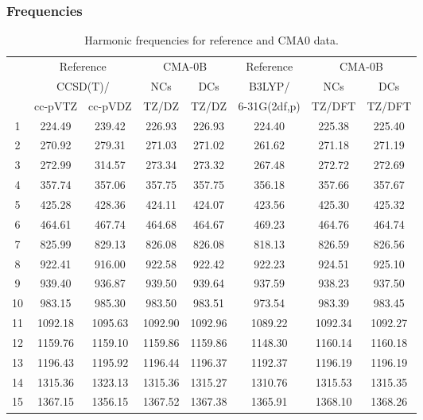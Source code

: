 \documentclass[10pt,oneside]{article}
\begin{document}
\clearpage

\subsubsection*{Frequencies}
\begin{table}[h!]
\centering
\caption{Harmonic frequencies for reference and CMA0 data.}
\begin{tabular}{cccccccc}
\toprule
{} & \multicolumn{2}{c}{Reference} & \multicolumn{2}{c}{CMA-0B} &    Reference & \multicolumn{2}{c}{CMA-0B} \\
{} & \multicolumn{2}{c}{CCSD(T)/} &     NCs &     DCs &       B3LYP/ &     NCs &     DCs \\
{} &   cc-pVTZ & cc-pVDZ &   TZ/DZ &   TZ/DZ & 6-31G(2df,p) &  TZ/DFT &  TZ/DFT \\
\midrule
1  &    224.49 &  239.42 &  226.93 &  226.93 &       224.40 &  225.38 &  225.40 \\
2  &    270.92 &  279.31 &  271.03 &  271.02 &       261.62 &  271.18 &  271.19 \\
3  &    272.99 &  314.57 &  273.34 &  273.32 &       267.48 &  272.72 &  272.69 \\
4  &    357.74 &  357.06 &  357.75 &  357.75 &       356.18 &  357.66 &  357.67 \\
5  &    425.28 &  428.36 &  424.11 &  424.07 &       423.56 &  425.30 &  425.32 \\
6  &    464.61 &  467.74 &  464.68 &  464.67 &       469.23 &  464.76 &  464.74 \\
7  &    825.99 &  829.13 &  826.08 &  826.08 &       818.13 &  826.59 &  826.56 \\
8  &    922.41 &  916.00 &  922.58 &  922.42 &       922.23 &  924.51 &  925.10 \\
9  &    939.40 &  936.87 &  939.50 &  939.64 &       937.59 &  938.23 &  937.50 \\
10 &    983.15 &  985.30 &  983.50 &  983.51 &       973.54 &  983.39 &  983.45 \\
11 &   1092.18 & 1095.63 & 1092.90 & 1092.96 &      1089.22 & 1092.34 & 1092.27 \\
12 &   1159.76 & 1159.10 & 1159.86 & 1159.86 &      1148.30 & 1160.14 & 1160.18 \\
13 &   1196.43 & 1195.92 & 1196.44 & 1196.37 &      1192.37 & 1196.19 & 1196.19 \\
14 &   1315.36 & 1323.13 & 1315.36 & 1315.27 &      1310.76 & 1315.53 & 1315.35 \\
15 &   1367.15 & 1356.15 & 1367.52 & 1367.38 &      1365.91 & 1368.10 & 1368.26 \\

\end{tabular}
\end{table}
\end{document}
